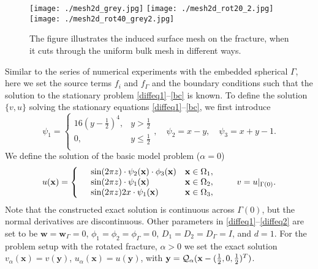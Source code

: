\documentclass{article}
\newcommand{\bx}{\mathbf x}
\newcommand{\by}{\mathbf y}
\begin{document}
\begin{figure}[ht!]
\begin{center}
\texttt{[image: ./mesh2d\_grey.jpg]}  \texttt{[image: ./mesh2d\_rot20\_2.jpg]}
\texttt{[image: ./mesh2d\_rot40\_grey2.jpg]}
\caption{\label{fig:frac}
The figure illustrates the induced surface mesh on the fracture, when it cuts through the uniform bulk mesh in different ways.}
\end{center}
\end{figure}


Similar to the series of numerical experiments with the embedded spherical $\Gamma$, here we set   the source terms $f_i$ and $f_\Gamma$ and the boundary conditions such that the solution to the stationary problem \eqref{diffeq1}--\eqref{bc} is known.  To define the  solution $\{v,u\}$ solving the stationary equations \eqref{diffeq1}--\eqref{bc}, we first introduce
\begin{equation}\nonumber
\psi_1 = \left\{
\begin{array}{lr}
 16(y-\frac12)^4,& y>\frac12\\
 0, & y \le \frac12\\
\end{array}
\right.,\quad\psi_2 = x -y,\quad \psi_3 = x + y - 1.
\end{equation}
We define the solution of the basic model problem ($\alpha=0$)
\begin{equation}\nonumber
u(\bx)=\left\{
 \begin{array}{rl r}
  & \sin(2\pi z)\cdot\psi_2(\bx) \cdot\phi_3(\bx) & \bx\in \Omega_1,\\
  & \sin(2\pi z)\cdot\psi_1(\bx) & \bx\in \Omega_2,\\
  & \sin(2\pi z)2x\cdot\psi_1(\bx) & \bx\in \Omega_3,
 \end{array}
 \right.\qquad v=u|_{\Gamma(0)}.
\end{equation}
Note that the constructed exact solution is continuous across $\Gamma(0)$, but the normal derivatives are discontinuous.
Other parameters in \eqref{diffeq1}--\eqref{diffeq2} are set to be  $\mathbf{w}=\mathbf{w}_\Gamma=0$, $\phi_1=\phi_2=\phi_\Gamma=0$, $D_1=D_2=D_\Gamma=I$, and $d=1$. For the problem setup with the rotated fracture, $\alpha>0$ we set the exact solution
$v_\alpha(\bx)=v(\by)$, $u_\alpha(\bx)=u(\by) $, with $\by=\mathcal{Q}_\alpha(\bx-({\small\frac12},0,{\small\frac12})^T)$.
\end{document}
